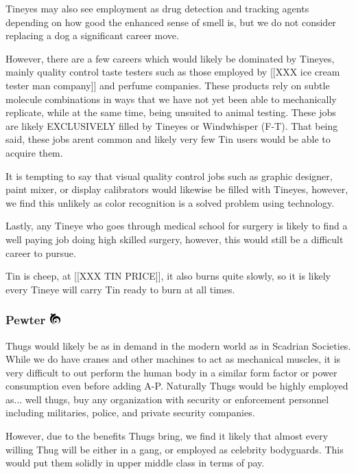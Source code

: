 \documentclass[conference]{IEEEtran}
\newcommand{\n}{\hfill\break}
\begin{document}
	Tineyes may also see employment as drug detection and tracking agents depending on how good the enhanced sense of smell is, but we do not consider replacing a dog a significant career move.
	
	However, there are a few careers which would likely be dominated by Tineyes, mainly quality control taste testers such as those employed by [[XXX ice cream tester man  company]] and perfume companies.  These products rely on subtle molecule combinations in ways that we have not yet been able to mechanically replicate, while at the same time, being unsuited to animal testing.  These jobs are likely EXCLUSIVELY filled by Tineyes or Windwhisper (F-T).  That  being said, these jobs arent common and likely very few Tin users would be able to acquire them.\n
	
	It is tempting to say that visual quality control jobs such as graphic designer, paint mixer, or display calibrators would likewise be filled with Tineyes, however, we find this unlikely as color recognition is a solved problem using technology.\n
	
	Lastly, any Tineye who goes through medical school for surgery is likely to find a well paying job doing high skilled surgery, however, this would still be a difficult career to pursue.\n
	
	Tin is cheep, at [[XXX TIN PRICE]], it also burns quite slowly, so it is likely every Tineye will carry Tin ready to burn at all times.\n
	\subsubsection{\textbf{Pewter}    \includegraphics[height=1em]{images/Pewter.png}}\label{sec:mistings:pewter}
	Thugs would likely be as in demand in the modern world as in Scadrian Societies.  While we do have cranes and other machines to act as mechanical muscles, it is very difficult to out perform the human body in a similar form factor or power consumption even before adding A-P.  Naturally Thugs would be highly employed as... well thugs, buy any organization with security or enforcement personnel including militaries, police, and private security companies.\n
	
	However, due to the benefits Thugs bring, we find it likely that almost every willing Thug will be either in a gang, or employed as celebrity bodyguards.  This would put them solidly in upper middle class in terms of pay.
	
\end{document}
